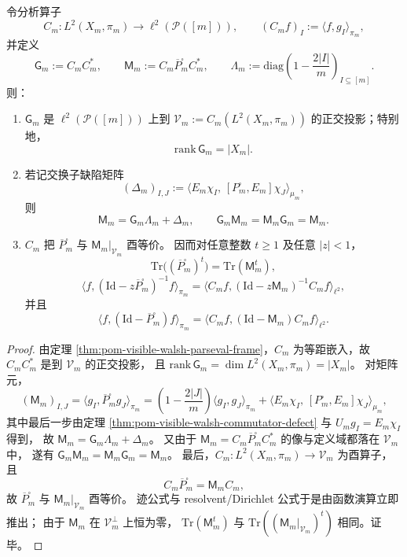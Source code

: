 \begin{proposition}\label{prop:pom-visible-walsh-gram-transfer}
令分析算子
\[
C_m:L^2(X_m,\pi_m)\to \ell^2(\mathcal P([m])),
\qquad
(C_m f)_I:=\langle f,g_I\rangle_{\pi_m},
\]
并定义
\[
\mathsf G_m:=C_mC_m^\ast,
\qquad
\mathsf M_m:=C_m\overline P_m^\square C_m^\ast,
\qquad
\Lambda_m:=\mathrm{diag}\!\left(1-\frac{2|I|}{m}\right)_{I\subseteq[m]}.
\]
则：
\begin{enumerate}
  \item \(\mathsf G_m\) 是 \(\ell^2(\mathcal P([m]))\) 上到
  \(
  \mathcal V_m:=C_m(L^2(X_m,\pi_m))
  \)
  的正交投影；特别地，
  \[
  \mathrm{rank}\,\mathsf G_m=|X_m|.
  \]
  \item 若记交换子缺陷矩阵
  \[
  (\mathsf \Delta_m)_{I,J}
  :=
  \langle E_m\chi_I,\,[P_m^\square,E_m]\chi_J\rangle_{\mu_m},
  \]
  则
  \[
  \mathsf M_m=\mathsf G_m\Lambda_m+\mathsf \Delta_m,
  \qquad
  \mathsf G_m\mathsf M_m=\mathsf M_m\mathsf G_m=\mathsf M_m.
  \]
  \item \(C_m\) 把 \(\overline P_m^\square\) 与 \(\mathsf M_m|_{\mathcal V_m}\) 酉等价。
  因而对任意整数 \(t\ge 1\) 及任意 \(|z|<1\)，
  \[
  \mathrm{Tr}\bigl((\overline P_m^\square)^t\bigr)=\mathrm{Tr}(\mathsf M_m^t),
  \]
  \[
  \bigl\langle f,(\mathrm{Id}-z\overline P_m^\square)^{-1}f\bigr\rangle_{\pi_m}
  =
  \bigl\langle C_m f,(\mathrm{Id}-z\mathsf M_m)^{-1}C_m f\bigr\rangle_{\ell^2},
  \]
  并且
  \[
  \bigl\langle f,(\mathrm{Id}-\overline P_m^\square)f\bigr\rangle_{\pi_m}
  =
  \bigl\langle C_m f,(\mathrm{Id}-\mathsf M_m)C_m f\bigr\rangle_{\ell^2}.
  \]
\end{enumerate}
\end{proposition}
\begin{proof}
由定理 \ref{thm:pom-visible-walsh-parseval-frame}，\(C_m\) 为等距嵌入，故 \(C_mC_m^\ast\) 是到 \(\mathcal V_m\) 的正交投影，
且
\(
\mathrm{rank}\,\mathsf G_m=\dim L^2(X_m,\pi_m)=|X_m|
\)。
对矩阵元，
\[
(\mathsf M_m)_{I,J}
=\langle g_I,\overline P_m^\square g_J\rangle_{\pi_m}
=\left(1-\frac{2|J|}{m}\right)\langle g_I,g_J\rangle_{\pi_m}
+\langle E_m\chi_I,\,[P_m^\square,E_m]\chi_J\rangle_{\mu_m},
\]
其中最后一步由定理 \ref{thm:pom-visible-walsh-commutator-defect} 与 \(U_m g_I=E_m\chi_I\) 得到，
故 \(\mathsf M_m=\mathsf G_m\Lambda_m+\mathsf \Delta_m\)。
又由于 \(\mathsf M_m=C_m\overline P_m^\square C_m^\ast\) 的像与定义域都落在 \(\mathcal V_m\) 中，
遂有 \(\mathsf G_m\mathsf M_m=\mathsf M_m\mathsf G_m=\mathsf M_m\)。
最后，\(C_m:L^2(X_m,\pi_m)\to\mathcal V_m\) 为酉算子，且
\[
C_m\overline P_m^\square=\mathsf M_m C_m,
\]
故 \(\overline P_m^\square\) 与 \(\mathsf M_m|_{\mathcal V_m}\) 酉等价。
迹公式与 resolvent/Dirichlet 公式于是由函数演算立即推出；
由于 \(\mathsf M_m\) 在 \(\mathcal V_m^\perp\) 上恒为零，
\(\mathrm{Tr}(\mathsf M_m^t)\) 与 \(\mathrm{Tr}((\mathsf M_m|_{\mathcal V_m})^t)\) 相同。证毕。
\end{proof}

